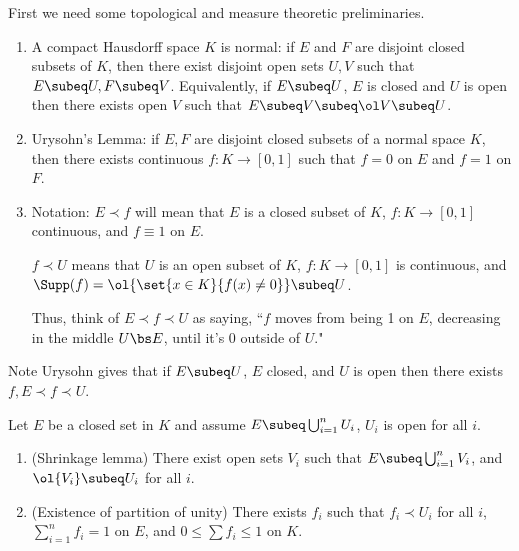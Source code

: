 First we need some topological and measure theoretic preliminaries.
\begin{enumerate}
\item
A compact Hausdorff space $K$ is normal: if $E$ and $F$ are disjoint closed subsets of $K$, then there exist disjoint open sets $U,V$ such that $E\subeq U,F\subeq V$. Equivalently, if $E\subeq U$, $E$ is closed and $U$ is open then there exists open $V$ such that $E\subeq V\subeq \ol V\subeq U$. 
\item {}
Urysohn's Lemma: if $E,F$ are disjoint closed subsets of a normal space $K$, then there exists continuous $f:K\to [0,1]$ such that $f=0$ on $E$ and $f=1$ on $F$.
\item {}
Notation: $E\prec f$ will mean that $E$ is a closed subset of $K$, $f:K\to [0,1]$ continuous, and $f\equiv 1$ on $E$. 

$f\prec U$ means that $U$ is an open subset of $K$, $f:K\to [0,1]$ is continuous, and $\Supp(f)=\ol{\set{x\in K}{f(x)\ne 0}}\subeq U$.

Thus, think of $E\prec f\prec U$ as saying, ``$f$ moves from being 1 on $E$, decreasing in the middle $U\bs E$, until it's 0 outside of $U$."
\end{enumerate}
Note Urysohn gives that if $E\subeq U$, $E$ closed, and $U$ is open then there exists $f,E\prec f\prec U$.
\begin{lem}
Let $E$ be a closed set in $K$ and assume $E\subeq \bigcup_{i=1}^nU_i$, $U_i$ is open for all $i$.
\begin{enumerate}
\item (Shrinkage lemma)
There exist open sets $V_i$ such that $E\subeq \bigcup_{i=1}^n V_i$, and $\ol{V_i}\subeq U_i$ for all $i$.
\item (Existence of partition of unity)
There exists $f_i$ such that $f_i\prec U_i$ for all $i$, $\sum_{i=1}^n f_i=1$ on $E$, and $0\le \sum f_i\le 1$ on $K$. 
\end{enumerate}
\end{lem}
